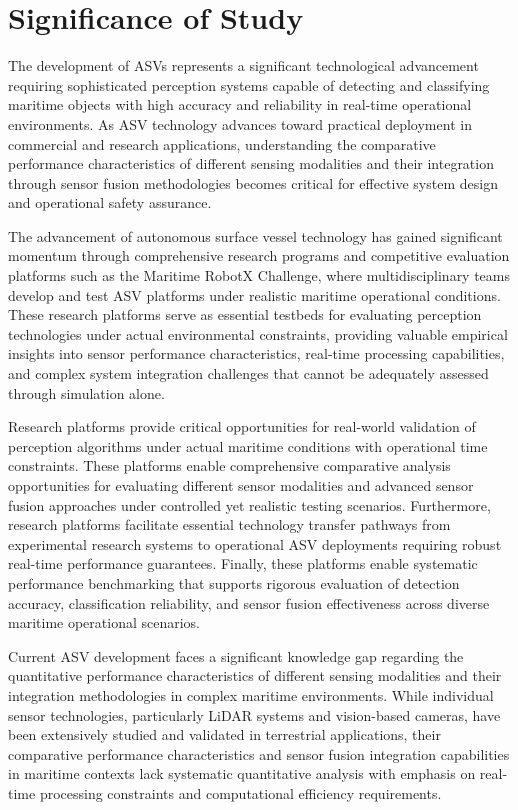 \documentclass{erauthesis}
\begin{document}
\section{Significance of Study} \label{significance_of_study}

The development of \acp{ASV} represents a significant technological advancement requiring sophisticated perception systems capable of detecting and classifying maritime objects with high accuracy and reliability in real-time operational environments. As \ac{ASV} technology advances toward practical deployment in commercial and research applications, understanding the comparative performance characteristics of different sensing modalities and their integration through sensor fusion methodologies becomes critical for effective system design and operational safety assurance.

The advancement of autonomous surface vessel technology has gained significant momentum through comprehensive research programs and competitive evaluation platforms such as the Maritime RobotX Challenge, where multidisciplinary teams develop and test \ac{ASV} platforms under realistic maritime operational conditions. These research platforms serve as essential testbeds for evaluating perception technologies under actual environmental constraints, providing valuable empirical insights into sensor performance characteristics, real-time processing capabilities, and complex system integration challenges that cannot be adequately assessed through simulation alone.

Research platforms provide critical opportunities for real-world validation of perception algorithms under actual maritime conditions with operational time constraints. These platforms enable comprehensive comparative analysis opportunities for evaluating different sensor modalities and advanced sensor fusion approaches under controlled yet realistic testing scenarios. Furthermore, research platforms facilitate essential technology transfer pathways from experimental research systems to operational \ac{ASV} deployments requiring robust real-time performance guarantees. Finally, these platforms enable systematic performance benchmarking that supports rigorous evaluation of detection accuracy, classification reliability, and sensor fusion effectiveness across diverse maritime operational scenarios.

Current \ac{ASV} development faces a significant knowledge gap regarding the quantitative performance characteristics of different sensing modalities and their integration methodologies in complex maritime environments. While individual sensor technologies, particularly \ac{LiDAR} systems and vision-based cameras, have been extensively studied and validated in terrestrial applications, their comparative performance characteristics and sensor fusion integration capabilities in maritime contexts lack systematic quantitative analysis with emphasis on real-time processing constraints and computational efficiency requirements.
\end{document}
